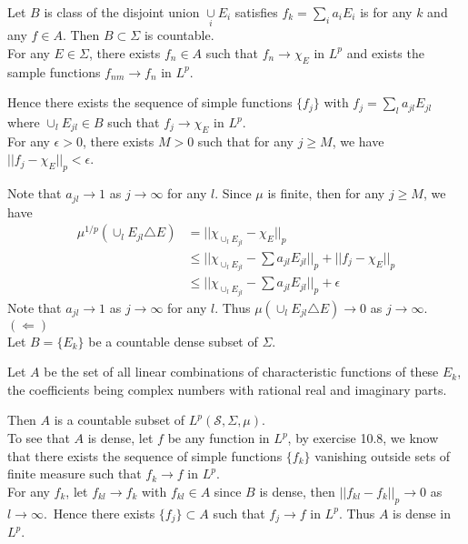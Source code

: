 \documentclass[a4paper,11pt]{article}
\begin{document}
\begin{enumerate}
\begin{enumerate}
			Let $B$ is class of the disjoint union $\underset{i}{\cup} E_i$ satisfies $f_k = \underset{i}{\sum} a_i E_i$ is for any $k$ and any $f \in A$. Then $B \subset \Sigma$ is countable.\\

			For any $E \in \Sigma$, there exists $f_n \in A$ such that $f_n \to \chi_E$ in $L^p$ and exists the sample functions $f_{nm} \to f_n$ in $L^p$.\

			Hence there exists the sequence of simple functions $\{f_j\}$ with $f_j = \underset{l}{\sum} a_{jl} E_{jl}$ where $\cup_l E_{jl} \in B$ such that $f_j \to \chi_E$ in $L^p$.\\

			For any $\epsilon > 0$, there exists $M > 0$ such that for any $j \geq M$, we have $||f_j - \chi_E||_p < \epsilon$.\

			Note that $a_{jl} \to 1$ as $j \to \infty$ for any $l$. Since $\mu$ is finite, then for any $j \geq M$, we have
				$$\begin{aligned}
				\mu^{1/p} (\cup_l E_{jl} \triangle E)
				&= ||\chi_{\cup_l E_{jl}} - \chi_E||_p\\
				&\leq ||\chi_{\cup_l E_{jl}} - \sum a_{jl} E_{jl} ||_p + ||f_j - \chi_E||_p\\
				&\leq ||\chi_{\cup_l E_{jl}} - \sum a_{jl} E_{jl} ||_p + \epsilon
				\end{aligned}$$
			Note that $a_{jl} \to 1$ as $j \to \infty$ for any $l$. Thus $\mu(\cup_l E_{jl} \triangle E) \to 0$ as $j \to \infty$.\\

		$(\Leftarrow)$\\
			Let $B = \{E_k\}$ be a countable dense subset of $\Sigma$.\

			Let $A$ be the set of all linear combinations of characteristic functions of these $E_k$, the coefficients being complex numbers with rational real and imaginary parts.\

			Then $A$ is a countable subset of $L^p (\mathscr{S}, \Sigma, \mu)$.\\

			To see that $A$ is dense, let $f$ be any function in $L^p$, by exercise 10.8, we know that there exists the sequence of simple functions $\{f_k\}$ vanishing outside sets of finite measure such that $f_k \to f$ in $L^p$.\\

			For any $f_k$, let $f_{kl} \to f_k$ with $f_{kl} \in A$ since $B$ is dense, then $||f_{kl} - f_k||_p \to 0$ as $l \to \infty$.\
			Hence there exists $\{f_j\} \subset A$ such that $f_j \to f$ in $L^p$. Thus $A$ is dense in $L^p$.\\
	\end{enumerate}




\end{enumerate}
\end{document}
